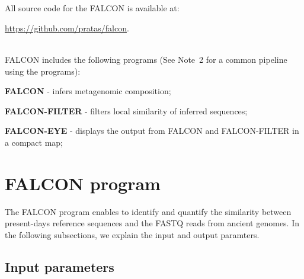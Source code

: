 \documentclass[11pt,journal,compsoc]{report}[1]
\begin{document}
~\\
~\\
All source code for the FALCON is available at:
\begin{itemize}
\begin{sloppypar}
\item \url{https://github.com/pratas/falcon}.
\end{sloppypar}
\end{itemize}
~\\
FALCON includes the following programs (See Note~2 for a common pipeline using 
the programs):
\begin{enumerate}
\begin{sloppypar}
\item \textbf{FALCON} - infers metagenomic composition;
\item \textbf{FALCON-FILTER} - filters local similarity of inferred sequences;
\item \textbf{FALCON-EYE} - displays the output from FALCON and FALCON-FILTER in 
a compact map;
\end{sloppypar}
\end{enumerate}

\section*{FALCON program}

The FALCON program enables to identify and quantify the similarity between
present-days reference sequences and the FASTQ reads from ancient genomes.
In the following subsections, we explain the input and output paramters.

\subsection*{Input parameters}
\end{document}
